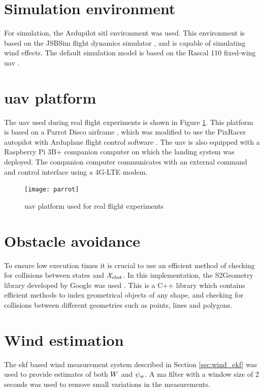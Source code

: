 \section{Simulation environment}
For simulation, the Ardupilot \ac{sitl} environment \cite{ardupilot_sitl} was used. This environment is based on the 
JSBSim flight dynamics simulator \cite{jsbsim}, and is capable of simulating wind effects. The default simulation model is based on the 
Rascal 110 fixed-wing \ac{uav} \cite{rascal}.

\section{\ac{uav} platform}
The \ac{uav} used during real flight experiments is shown in Figure \ref{fig:parrot}. This platform is based on a Parrot Disco airframe \cite{parrot}, 
which was modified to use the PixRacer autopilot \cite{pixracer} with Arduplane flight control software \cite{arduplane}. The \ac{uav} is also equipped with a 
Raspberry Pi 3B+ companion computer on which the landing system was deployed. The companion computer communicates with an external command and control interface using 
a 4G-LTE modem.

\begin{figure}
    \centering
    \texttt{[image: parrot]}
    \caption{\ac{uav} platform used for real flight experiments}
    \label{fig:parrot}
\end{figure}


\section{Obstacle avoidance}
To ensure low execution times it is crucial to use an efficient method of checking for collisions between states and $\mathcal{X}_{\text{obst}}$. 
In this implementation, the S2Geometry library developed by Google was used \cite{s2geo}. This is a C++ library which contains 
efficient methods to index geometrical objects of any shape, and checking for collisions between different geometries such as points, lines and polygons. 

\section{Wind estimation}
The \ac{ekf} based wind measurement system described in Section \ref{sec:wind_ekf} was used to provide estimates of both $W$ and $\psi_w$. A \ac{ma} filter with a 
window size of 2 seconds was used to remove small variations in the measurements.

